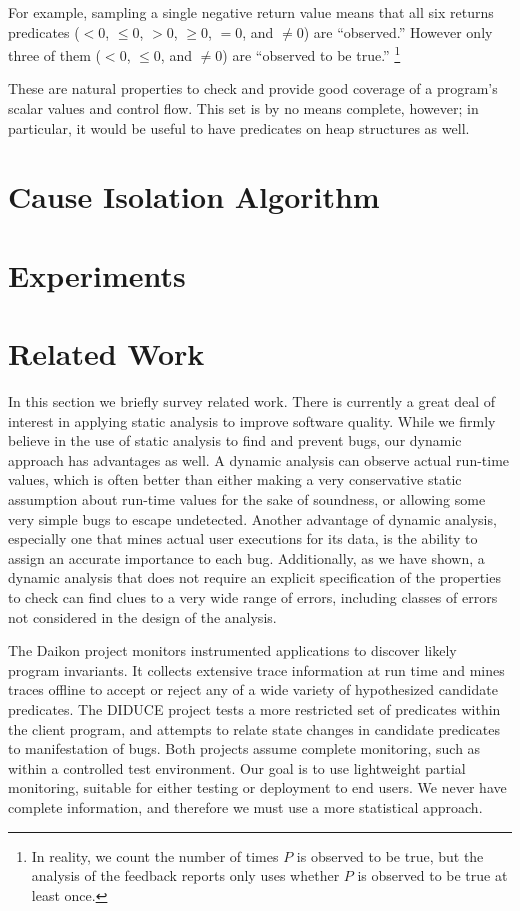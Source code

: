 \documentclass[draft]{sig-alternate}
\begin{document}
For example, sampling a single negative return value means that all
six returns predicates ($< 0$, $\leq 0$, $> 0$, $\geq 0$, $= 0$, and
$\neq 0$) are ``observed.''  However only three of them ($< 0$, $\leq
0$, and $\neq 0$) are ``observed to be true.''  \footnote{In reality,
  we count the number of times $P$ is observed to be true, but the
  analysis of the feedback reports only uses whether $P$ is observed
  to be true at least once.}

  These are natural properties to check and provide good coverage of a
  program's scalar values and control flow.  This set is by no means
  complete, however; in particular, it would be useful to have
  predicates on heap structures as well.

\section{Cause Isolation Algorithm}
\label{sec:algorithm}


\section{Experiments}
\label{sec:experiments}




\section{Related Work}
\label{sec:related-work}

In this section we briefly survey related work. There is currently a
great deal of interest in applying static analysis to improve software
quality.  While we firmly believe in the use of static analysis to
find and prevent bugs, our dynamic approach has advantages as well.  A dynamic
analysis can observe actual run-time values, which is often better
than either making a very conservative static assumption about run-time
values for the sake of soundness, or allowing some very simple bugs to escape
undetected.  Another advantage of dynamic analysis, especially one
that mines actual user executions for its data, is the ability to
assign an accurate importance to each bug.  Additionally, as we have shown,
a dynamic analysis that does not require an explicit specification of
the properties to check can find clues to a very wide range of errors,
including classes of errors not considered in the design of the
analysis.

The Daikon project \cite{ernst2001} monitors instrumented applications
to discover likely program invariants.  It collects extensive trace
information at run time and mines traces offline to accept or reject any
of a wide variety of hypothesized candidate predicates.  The DIDUCE project
\cite{ICSE02*291} tests a more restricted set of predicates within the
client program, and attempts to relate state changes in candidate
predicates to manifestation of bugs.  Both projects assume complete
monitoring, such as within a controlled test environment.  Our goal is
to use lightweight partial monitoring, suitable for either testing
or deployment to end users.  We never have complete information, and
therefore we must use a more statistical approach.
\end{document}
